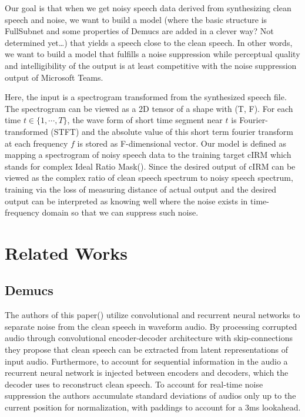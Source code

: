 \documentclass[11pt]{article}
\begin{document}
Our goal is that when we get noisy speech data derived from synthesizing clean speech and noise, we want to build a model (where the basic structure is FullSubnet and some properties of Demucs are added in a clever way? Not determined yet…) that yields a speech close to the clean speech. In other words, we want to build a model that fulfills a noise suppression while perceptual quality and intelligibility of the output is at least competitive with the noise suppression output of Microsoft Teams. 

Here, the input is a spectrogram transformed from the synthesized speech file. The spectrogram can be viewed as a 2D tensor of a shape with (T, F). For each time $t \in \{1, \cdots, T\}$, the wave form of short time segment near $t$ is Fourier-transformed (STFT) and the absolute value of this short term fourier transform at each frequency $f$ is stored as F-dimensional vector. Our model is defined as mapping a spectrogram of noisy speech data to the training target cIRM which stands for complex Ideal Ratio Mask(\cite{CIRM}). Since the desired output of cIRM can be viewed as the complex ratio of clean speech spectrum to noisy speech spectrum, training via the loss of measuring distance of actual output and the desired output can be interpreted as knowing well where the noise exists in time-frequency domain so that we can suppress such noise.




\section{Related Works}

\subsection{Demucs}

The authors of this paper(\cite{Demucs}) utilize convolutional and recurrent neural networks to separate noise from the clean speech in waveform audio. By processing corrupted audio through convolutional encoder-decoder architecture with skip-connections they propose that clean speech can be extracted from latent representations of input audio. Furthermore, to account for sequential information in the audio a recurrent neural network is injected between encoders and decoders, which the decoder uses to reconstruct clean speech. To account for real-time noise suppression the authors accumulate standard deviations of audios only up to the current position for normalization, with paddings to account for a 3ms lookahead.
\end{document}
